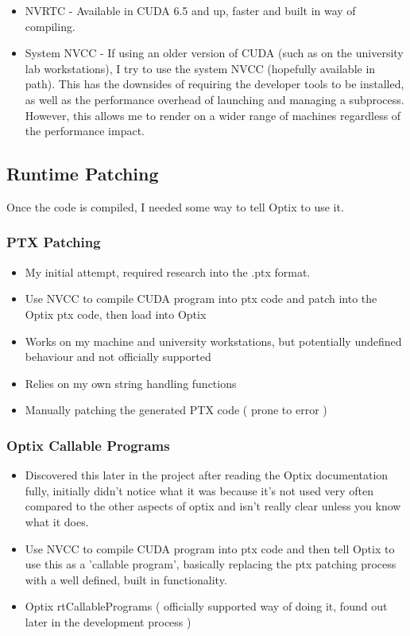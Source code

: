 \documentclass[11pt,a4paper,final,notitlepage]{report}
\begin{document}
\begin{itemize}
	\item NVRTC - Available in CUDA 6.5 and up, faster and built in way of compiling.
	\item System NVCC - If using an older version of CUDA (such as on the university lab workstations), I try to use the system NVCC (hopefully available in path). This has the downsides of requiring the developer tools to be installed, as well as the performance overhead of launching and managing a subprocess. However, this allows me to render on a wider range of machines regardless of the performance impact.
\end{itemize}

\subsection{Runtime Patching}
Once the code is compiled, I needed some way to tell Optix to use it.

\subsubsection{PTX Patching}
		\begin{itemize}
			\item My initial attempt, required research into the .ptx format.
			\item Use NVCC to compile CUDA program into ptx code and patch into the Optix ptx code, then load into Optix
			\item Works on my machine and university workstations, but potentially undefined behaviour and not officially supported
			\item Relies on my own string handling functions
			\item Manually patching the generated PTX code ( prone to error )
		\end{itemize}



\subsubsection{Optix Callable Programs}

\begin{itemize}
			\item Discovered this later in the project after reading the Optix documentation fully, initially didn't notice what it was because it's not used very often compared to the other aspects of optix and isn't really clear unless you know what it does.
			\item Use NVCC to compile CUDA program into ptx code and then tell Optix to use this as a 'callable program', basically replacing the ptx patching process with a well defined, built in functionality.
				\item Optix rtCallablePrograms ( officially supported way of doing it, found out later in the development process )
			
\end{itemize}
\end{document}
